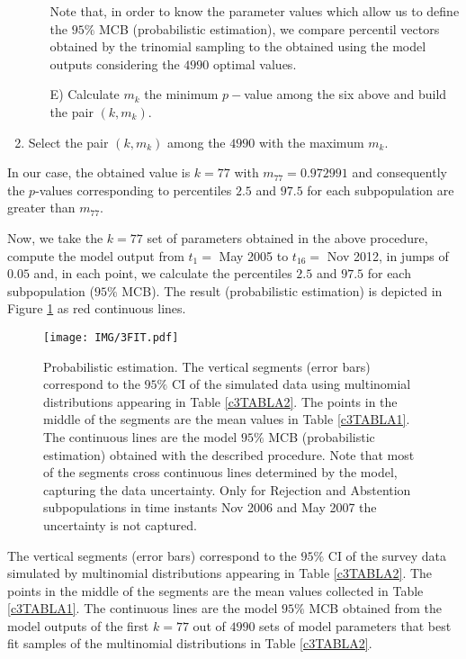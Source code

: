 \begin{enumerate}
\begin{itemize}
Note that, in order to know the parameter values which allow us to define the $95\%$ MCB (probabilistic estimation), we compare percentil vectors obtained by the trinomial sampling to the obtained using the model outputs considering the $4990$ optimal values.
 
\item[E)] Calculate $m_k$ the minimum $p-$value among the six above and build the pair $(k, m_k)$.

\end{itemize}

\item Select the pair $(k, m_k)$ among the $4990$ with the maximum $m_k$.

\end{enumerate}

In our case, the obtained value is $k=77$ with $m_{77}=0.972991$ and consequently the $p$-values corresponding to percentiles $2.5$ and $97.5$ for each subpopulation are greater than $m_{77}$.

Now, we take the $k=77$ set of parameters obtained in the above procedure, compute the model output from $t_1=$ May 2005 to $t_{16}=$ Nov 2012, in jumps of $0.05$ and, in each point, we calculate the percentiles $2.5$ and $97.5$ for each subpopulation ($95\%$ MCB). The result (probabilistic estimation) is depicted in Figure \ref{3bandas} as red continuous lines.

\begin{figure}[h]
 \begin{center}
  \texttt{[image: IMG/3FIT.pdf]}\\
  \caption{Probabilistic estimation. The vertical segments (error bars) correspond to the $95\%$ CI of the simulated data using multinomial distributions appearing in Table \ref{c3TABLA2}. The points in the middle of the segments are the mean values in Table \ref{c3TABLA1}. The continuous lines are the model $95\%$ MCB (probabilistic estimation) obtained with the described procedure. Note that most of the segments cross continuous lines determined by the model, capturing the data uncertainty. Only for Rejection and Abstention subpopulations in time instants Nov 2006 and May 2007 the uncertainty is not captured.} \label{3bandas}
\end{center}
\end{figure}   

The vertical segments (error bars) correspond to the $95\%$ CI of the survey data simulated by multinomial distributions appearing in Table \ref{c3TABLA2}. The points in the middle of the segments are the mean values collected in Table \ref{c3TABLA1}. The continuous lines are the model $95\%$ MCB obtained from the model outputs of the first $k=77$ out of $4990$ sets of model parameters that best fit samples of the multinomial distributions in Table \ref{c3TABLA2}.

